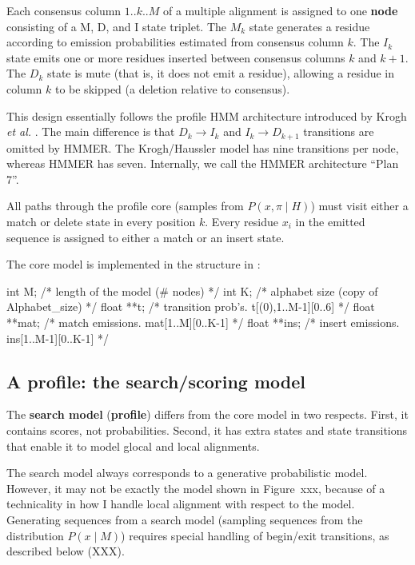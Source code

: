 \documentclass[11pt]{article}
\begin{document}
Each consensus column $1..k..M$ of a multiple alignment is assigned to
one \textbf{node} consisting of a M, D, and I state triplet. The $M_k$
state generates a residue according to emission probabilities
estimated from consensus column $k$. The $I_k$ state emits one or more
residues inserted between consensus columns $k$ and $k+1$. The $D_k$
state is mute (that is, it does not emit a residue), allowing a
residue in column $k$ to be skipped (a deletion relative to
consensus).

This design essentially follows the profile HMM architecture
introduced by Krogh \emph{et al.}  \citep{Krogh94}. The main
difference is that $D_k \rightarrow I_k$ and $I_k \rightarrow D_{k+1}$
transitions are omitted by HMMER. The Krogh/Haussler model has nine
transitions per node, whereas HMMER has seven. Internally, we call the
HMMER architecture ``Plan 7''.

All paths through the profile core (samples from $P(x, \pi \mid H)$)
must visit either a match or delete state in every position $k$.
Every residue $x_i$ in the emitted sequence is assigned to either a
match or an insert state.

The core model is implemented in the  structure in
:

\begin{cchunk}
  int     M;                    /* length of the model (# nodes)          */
  int     K;			/* alphabet size (copy of Alphabet_size)  */
  float **t;                    /* transition prob's. t[(0),1..M-1][0..6] */
  float **mat;                  /* match emissions.  mat[1..M][0..K-1]    */ 
  float **ins;                  /* insert emissions. ins[1..M-1][0..K-1]  */
\end{cchunk}


\subsection{A profile: the search/scoring model}

The \textbf{search model} (\textbf{profile}) differs from the core
model in two respects. First, it contains scores, not probabilities.
Second, it has extra states and state transitions that enable it to
model glocal and local alignments.

The search model always corresponds to a generative probabilistic
model. However, it may not be exactly the model shown in Figure~{xxx},
because of a technicality in how I handle local alignment with respect
to the model. Generating sequences from a search model (sampling
sequences from the distribution $P(x \mid M)$) requires special
handling of begin/exit transitions, as described below (XXX).
\end{document}
